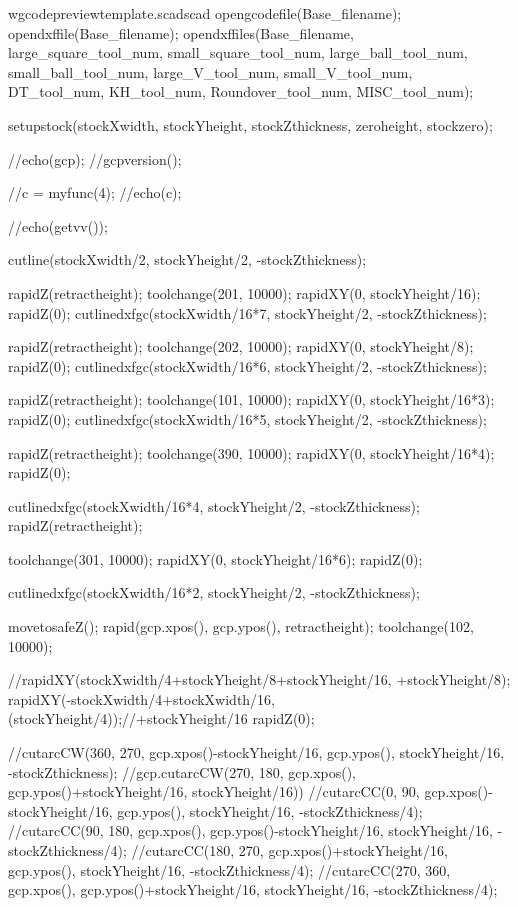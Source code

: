 \documentclass{ltxdoc}
\begin{document}
\begin{writecode}{w}{gcodepreviewtemplate.scad}{scad}
opengcodefile(Base_filename);
opendxffile(Base_filename);
opendxffiles(Base_filename,
                 large_square_tool_num,
                 small_square_tool_num,
                 large_ball_tool_num,
                 small_ball_tool_num,
                 large_V_tool_num,
                 small_V_tool_num,
                 DT_tool_num,
                 KH_tool_num,
                 Roundover_tool_num,
                 MISC_tool_num);

setupstock(stockXwidth, stockYheight, stockZthickness, zeroheight, stockzero);

//echo(gcp);
//gcpversion();

//c = myfunc(4);
//echo(c);

//echo(getvv());

cutline(stockXwidth/2, stockYheight/2, -stockZthickness);

rapidZ(retractheight);
toolchange(201, 10000);
rapidXY(0, stockYheight/16);
rapidZ(0);
cutlinedxfgc(stockXwidth/16*7, stockYheight/2, -stockZthickness);


rapidZ(retractheight);
toolchange(202, 10000);
rapidXY(0, stockYheight/8);
rapidZ(0);
cutlinedxfgc(stockXwidth/16*6, stockYheight/2, -stockZthickness);

rapidZ(retractheight);
toolchange(101, 10000);
rapidXY(0, stockYheight/16*3);
rapidZ(0);
cutlinedxfgc(stockXwidth/16*5, stockYheight/2, -stockZthickness);

rapidZ(retractheight);
toolchange(390, 10000);
rapidXY(0, stockYheight/16*4);
rapidZ(0);

cutlinedxfgc(stockXwidth/16*4, stockYheight/2, -stockZthickness);
rapidZ(retractheight);

toolchange(301, 10000);
rapidXY(0, stockYheight/16*6);
rapidZ(0);

cutlinedxfgc(stockXwidth/16*2, stockYheight/2, -stockZthickness);


movetosafeZ();
rapid(gcp.xpos(), gcp.ypos(), retractheight);
toolchange(102, 10000);

//rapidXY(stockXwidth/4+stockYheight/8+stockYheight/16, +stockYheight/8);
rapidXY(-stockXwidth/4+stockXwidth/16, (stockYheight/4));//+stockYheight/16
rapidZ(0);

//cutarcCW(360, 270, gcp.xpos()-stockYheight/16, gcp.ypos(), stockYheight/16, -stockZthickness);
//gcp.cutarcCW(270, 180, gcp.xpos(), gcp.ypos()+stockYheight/16, stockYheight/16))
//cutarcCC(0, 90, gcp.xpos()-stockYheight/16, gcp.ypos(), stockYheight/16, -stockZthickness/4);
//cutarcCC(90, 180, gcp.xpos(), gcp.ypos()-stockYheight/16, stockYheight/16, -stockZthickness/4);
//cutarcCC(180, 270, gcp.xpos()+stockYheight/16, gcp.ypos(), stockYheight/16, -stockZthickness/4);
//cutarcCC(270, 360, gcp.xpos(), gcp.ypos()+stockYheight/16, stockYheight/16, -stockZthickness/4);


\end{writecode}
\end{document}
